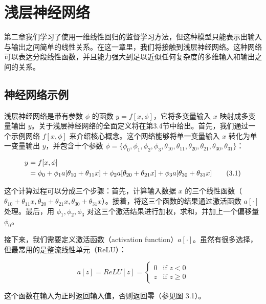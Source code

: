 \chapter{浅层神经网络}

第二章我们学习了使用一维线性回归的监督学习方法，但这种模型只能表示出输入与输出之间简单的线性关系。在这一章里，我们将接触到浅层神经网络。这种网络可以表达分段线性函数，并且能力强大到足以近似任何复杂度的多维输入和输出之间的关系。
\section{神经网络示例}
浅层神经网络是带有参数 \(\phi\) 的函数 \(y = f[x, \phi]\)，它将多变量输入 \(x\) 映射成多变量输出 \(y\)。关于浅层神经网络的全面定义将在第3.4节中给出。首先，我们通过一个示例网络 \(f[x, \phi]\) 来介绍核心概念。这个网络能够将单一变量输入 \(x\) 转化为单一变量输出 \(y\)，并包含十个参数 \(\phi = \{\phi_0, \phi_1, \phi_2, \phi_3, \theta_{10}, \theta_{11}, \theta_{20}, \theta_{21}, \theta_{30}, \theta_{31}\}\)：


\begin{align}
	y &= f[x, \phi] \notag \\ 
	&= \phi_0 + \phi_1a[\theta_{10} + \theta_{11}x] + \phi_2a[\theta_{20} + \theta_{21}x] + \phi_3a[\theta_{30} + \theta_{31}x] \tag{3.1}
\end{align}


这个计算过程可以分成三个步骤：首先，计算输入数据 \(x\) 的三个线性函数（\(\theta_{10} + \theta_{11}x, \theta_{20} + \theta_{21}x, \theta_{30} + \theta_{31}x\)）。接着，将这三个函数的结果通过激活函数 \(a[\cdot]\) 处理。最后，用 \(\phi_1, \phi_2, \phi_3\) 对这三个激活结果进行加权，求和，并加上一个偏移量 \(\phi_0\)。

接下来，我们需要定义激活函数（activation function）\(a[\cdot]\)。虽然有很多选择，但最常用的是整流线性单元（ReLU）：

\[
a[z] = ReLU[z] = 
\begin{cases}
	0 & \text{if } z < 0 \\
	z & \text{if } z \geq 0
\end{cases} \tag{3.2}
\]

这个函数在输入为正时返回输入值，否则返回零（参见图 3.1）。

